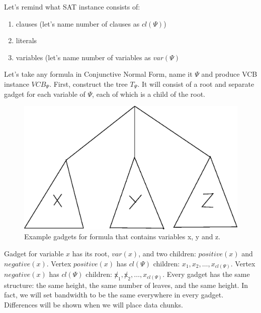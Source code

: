 Let's remind what SAT instance consists of:
\begin{enumerate}
\item clauses (let's name number of clauses as $cl(\Psi)$)
\item literals
\item variables (let's name number of variables as $var(\Psi)$
\end{enumerate}

Let's take any formula in Conjunctive Normal Form, name it $\Psi$ and produce
VCB instance $VCB_{\Psi}$. First, construct the tree $T_{\Psi}$. It will consist of
a root and separate gadget for each variable of $\Psi$, each of which
is a child of the root.


\begin{figure}[htbp]
\includegraphics[width = \columnwidth]{figs/gadgets.eps}
\caption{Example gadgets for formula that contains variables x, y and z.}
\label{fig:gadgets}
\end{figure}

Gadget for variable $x$ has its root, $var(x)$, and two children:
$positive(x)$ and $negative(x)$. Vertex $positive(x)$ has $cl(\Psi)$
children: $x_1, x_2, \ldots, x_{cl(\Psi)}$. Vertex $negative(x)$ has
$cl(\Psi)$ children: $\not x_1, \not x_2, \dots, x_{cl(\Psi)}$. Every
gadget has the same structure: the same height, the same number of
leaves, and the same height. In fact, we will set bandwidth to be the
same everywhere in every gadget. Differences will be shown when we
will place data chunks.



